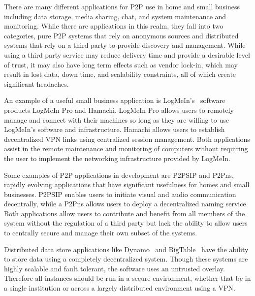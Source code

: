 \documentclass[conference]{IEEEtran}
\begin{document}
There are many different applications for P2P use in home and small business
including data storage, media sharing, chat, and system maintenance and
monitoring.  While there are applications in this realm, they fall into two
categories, pure P2P systems that rely on anonymous sources and distributed
systems that rely on a third party to provide discovery and management.  While
using a third party service may reduce delivery time and provide a desirable
level of trust, it may also have long term effects such as vendor lock-in,
which may result in lost data, down time, and scalability constraints, all of
which create significant headaches.

An example of a useful small business application is LogMeIn's~\cite{logmein}
software products LogMeIn Pro and Hamachi.  LogMeIn Pro allows users to remotely
manage and connect with their machines so long as they are willing to use
LogMeIn's software and infrastructure.  Hamachi allows users to establish
decentralized VPN links using centralized session management.  Both
applications assist in the remote maintenance and monitoring of computers
without requiring the user to implement the networking infrastructure provided
by LogMeIn.

Some examples of P2P applications in development are P2PSIP and P2Pns, rapidly
evolving applications that have significant usefulness for homes and small
businesses.  P2PSIP enables users to initiate visual and audio communication
decentrally, while a P2Pns allows users to deploy a decentralized naming
service.  Both applications allow users to contribute and benefit from all
members of the system without the regulation of a third party but lack the
ability to allow users to centrally secure and manage their own subset of the
systems.

Distributed data store applications like Dynamo~\cite{dynamo} and
BigTable~\cite{bigtable} have the ability to store data using a completely
decentralized system.  Though these systems are highly scalable and fault
tolerant, the software uses an untrusted overlay.  Therefore all instances
should be run in a secure environment, whether that be in a single institution
or across a largely distributed environment using a VPN.
\end{document}
